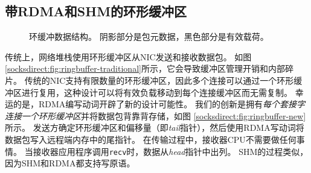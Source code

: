 \subsection{带RDMA和SHM的环形缓冲区}
\label{socksdirect:subsec:lockless-queue}

\begin{figure}[t]
	\centering
	\hspace{0.02\textwidth}
	
	\caption{环缓冲数据结构。 阴影部分是包元数据，黑色部分是有效载荷。}
\end{figure}

传统上，网络堆栈使用环形缓冲区从NIC发送和接收数据包。
如图 \ref {socksdirect:fig:ringbuffer-traditional}所示，它会导致缓冲区管理开销和内部碎片。
传统的NIC支持有限数量的环形缓冲区，因此多个连接可以通过一个环形缓冲区进行复用，这种设计可以将有效负载移动到每个连接缓冲区而无需复制。
幸运的是，RDMA编写动词开辟了新的设计可能性。
我们的创新是拥有\emph {每个套接字连接一个环形缓冲区}并将数据包背靠背存储，如图 \ref {socksdirect:fig:ringbuffer-new}所示。
发送方确定环形缓冲区和偏移量（即\emph {tail}指针），然后使用RDMA写动词将数据包写入远程端内存中的尾指针。
在传输过程中，接收器CPU不需要做任何事情。
当接收器应用程序调用\texttt {recv}时，数据从\emph {head}指针中出列。
SHM的过程类似，因为SHM和RDMA都支持写原语。

